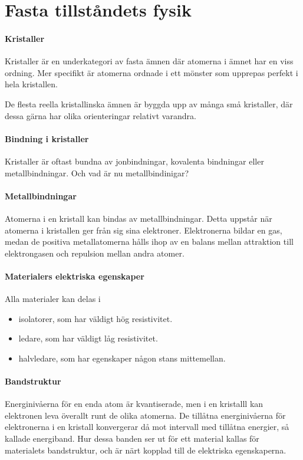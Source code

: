 \section{Fasta tillståndets fysik}

\paragraph{Kristaller}
Kristaller är en underkategori av fasta ämnen där atomerna i ämnet har en viss ordning. Mer specifikt är atomerna ordnade i ett mönster som upprepas perfekt i hela kristallen.

De flesta reella kristallinska ämnen är byggda upp av många små kristaller, där dessa gärna har olika orienteringar relativt varandra.

\paragraph{Bindning i kristaller}
Kristaller är oftast bundna av jonbindningar, kovalenta bindningar eller metallbindningar. Och vad är nu metallbindinigar?

\paragraph{Metallbindningar}
Atomerna i en kristall kan bindas av metallbindningar. Detta uppstår när atomerna i kristallen ger från sig sina elektroner. Elektronerna bildar en gas, medan de positiva metallatomerna hålls ihop av en balans mellan attraktion till elektrongasen och repulsion mellan andra atomer.

\paragraph{Materialers elektriska egenskaper}
Alla materialer kan delas i
\begin{itemize}
	\item isolatorer, som har väldigt hög resistivitet.
	\item ledare, som har väldigt låg resistivitet.
	\item halvledare, som har egenskaper någon stans mittemellan.
\end{itemize}

\paragraph{Bandstruktur}
Energinivåerna för en enda atom är kvantiserade, men i en kristalll kan elektronen leva överallt runt de olika atomerna. De tillåtna energinivåerna för elektronerna i en kristall konvergerar då mot intervall med tillåtna energier, så kallade energiband. Hur dessa banden ser ut för ett material kallas för materialets bandstruktur, och är närt kopplad till de elektriska egenskaperna.

